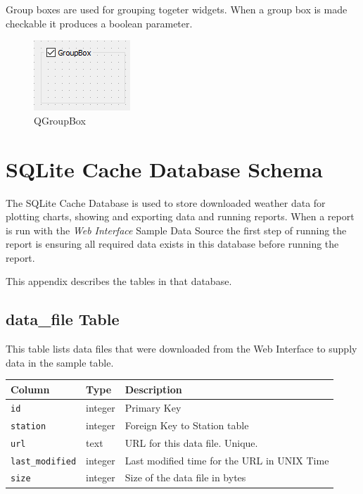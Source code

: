 \documentclass[a4paper,10pt]{book}
\begin{document}
Group boxes are used for grouping togeter widgets. When a group box is made checkable it produces a boolean parameter.

\begin {figure}[!ht]
 \centering
 \includegraphics[scale=1.0]{images/widget/qgroupbox}
 \caption{QGroupBox}
\end {figure}



\appendix

\chapter{SQLite Cache Database Schema}
The SQLite Cache Database is used to store downloaded weather data for plotting charts, showing and exporting data and running reports. When a report is run with the \emph{Web Interface} Sample Data Source the first step of running the report is ensuring all required data exists in this database before running the report.

This appendix describes the tables in that database.

\section{data\_file Table}
This table lists data files that were downloaded from the Web Interface to supply data in the sample table.

\begin{tabular}{p{2.5cm} p{2.5cm} l}
\hline
\textbf{Column} & \textbf{Type} & \textbf{Description} \\
\hline
\verb|id| & integer & Primary Key\\
\verb|station| & integer & Foreign Key to Station table\\
\verb|url| & text & URL for this data file. Unique.\\
\verb|last_modified| & integer & Last modified time for the URL in UNIX Time\\
\verb|size| & integer & Size of the data file in bytes\\
\hline
\end{tabular}
\end{document}
